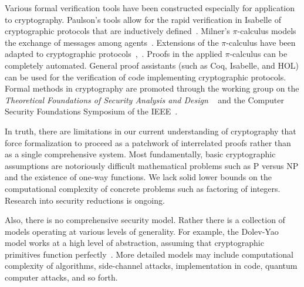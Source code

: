 \documentclass[11pt]{amsart} %
\begin{document}
Various formal verification tools have been constructed especially for application to cryptography.
Paulson's tools allow for the rapid verification in Isabelle of cryptographic protocols that are inductively defined~\cite{PaulsonXX}.  
Milner's $\pi$-calculus models the exchange of messages among
agents~\cite{RM99}.
Extensions of the $\pi$-calculus have been adapted to cryptographic protocols~\cite{AF},~\cite{SPI}.
Proofs in the applied $\pi$-calculus can be completely automated.
General proof assistants  (such as Coq, Isabelle, and HOL) can be used for the verification of code implementing
cryptographic protocols.
Formal methods in cryptography are promoted through 
the working group on the {\it Theoretical Foundations of Security
Analysis and Design}
~\cite{TFSAD}
\cite{FOSAD}
and the Computer Security Foundations Symposium of the IEEE~\cite{CSF2013}.

In truth, there are limitations in our current understanding of cryptography that force
formalization to proceed as a patchwork of interrelated proofs rather than as a single comprehensive system.
Most fundamentally, basic cryptographic assumptions are notoriously difficult mathematical
problems such as P versus NP  and the existence of one-way functions.  
We lack solid lower bounds on the computational complexity of concrete problems such as
factoring of integers.
Research into security reductions is ongoing.  

Also, there is no comprehensive security model.  Rather there is a collection of models operating at various
levels of generality.
For example, the Dolev-Yao model works at a high level of abstraction, assuming that cryptographic primitives function perfectly~\cite{DY}.
More detailed models may include computational complexity of algorithms,
side-channel attacks, implementation in code, quantum computer attacks, and so forth.
\end{document}
